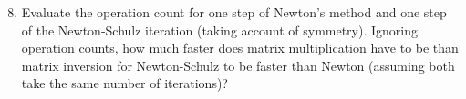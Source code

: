 \documentclass{article}
\begin{document}
\begin{enumerate}
	\setcounter{enumi}{7}
	\item Evaluate the operation count for one step of Newton's 
	method and one step of the Newton\nobreakdash-Schulz iteration (taking
	account of symmetry). Ignoring operation counts, how much faster
	does matrix multiplication have to be than matrix inversion for
	Newton\nobreakdash-Schulz to be faster than Newton (assuming both take the same number of iterations)?
\end{enumerate}

%
%
\end{document}
